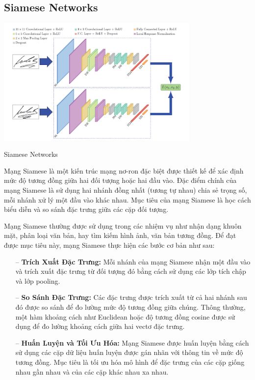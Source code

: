\documentclass[a4paper, 12pt, openany]{book}
\begin{document}
\subsection{Siamese Networks}

\begin{minipage}{\linewidth}
    \captionsetup{type=figure}
    \centering
    \includegraphics[width=10cm]{./assets/images/1_siamese-network.png}
    \caption{Siamese Networks\cite{https://builtin.com/machine-learning/siamese-network}}
\end{minipage} 

Mạng Siamese là một kiến trúc mạng nơ-ron đặc biệt được thiết kế để xác định mức độ tương đồng giữa hai đối tượng hoặc hai đầu vào. Đặc điểm chính của mạng Siamese là sử dụng hai nhánh đồng nhất (tương tự nhau) chia sẻ trọng số, mỗi nhánh xử lý một đầu vào khác nhau. Mục tiêu của mạng Siamese là học cách biểu diễn và so sánh đặc trưng giữa các cặp đối tượng.

Mạng Siamese thường được sử dụng trong các nhiệm vụ như nhận dạng khuôn mặt, phân loại văn bản, hay tìm kiếm hình ảnh, văn bản tương đồng. Để đạt được mục tiêu này, mạng Siamese thực hiện các bước cơ bản như sau:

\begin{itemize}
    \item[--] \textbf{Trích Xuất Đặc Trưng:} Mỗi nhánh của mạng Siamese nhận một đầu vào và trích xuất đặc trưng từ đối tượng đó bằng cách sử dụng các lớp tích chập và lớp pooling.

    \item[--] \textbf{So Sánh Đặc Trưng:} Các đặc trưng được trích xuất từ cả hai nhánh sau đó được so sánh để đo lường mức độ tương đồng giữa chúng. Thông thường, một hàm khoảng cách như Euclidean hoặc độ tương đồng cosine được sử dụng để đo lường khoảng cách giữa hai vectơ đặc trưng.

    \item[--] \textbf{Huấn Luyện và Tối Ưu Hóa:} Mạng Siamese được huấn luyện bằng cách sử dụng các cặp dữ liệu huấn luyện được gán nhãn với thông tin về mức độ tương đồng. Mục tiêu là tối ưu hóa mô hình để đặc trưng của các cặp giống nhau gần nhau và của các cặp khác nhau xa nhau.
\end{itemize}
\end{document}
